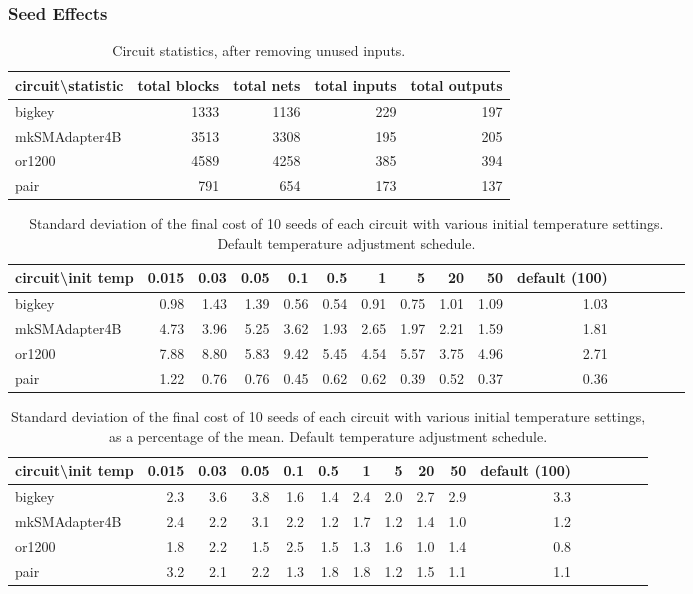 \documentclass[11pt]{article}
\begin{document}
\subsubsection{Seed Effects}

\begin{table} \centering
\begin{tabular}{l | *4r}
\hline\hline
circuit\textbackslash statistic & total blocks & total nets & total inputs & total outputs \\
\hline
bigkey & 1333 & 1136 & 229 & 197 \\
mkSMAdapter4B & 3513 & 3308 & 195 & 205 \\
or1200 & 4589 & 4258 & 385 & 394 \\
pair   & 791  &  654 & 173 & 137 \\
\hline\hline
\end{tabular}
\caption{Circuit statistics, after removing unused inputs.}
\label{tab:circuit-stats}
\end{table}

\begin{table}
\centering
\begin{tabular}{l | *{15}r}
\hline\hline
circuit\textbackslash init temp & 0.015 & 0.03 & 0.05 & 0.1 & 0.5 & 1 & 5 & 20 & 50 & default (100)\\
\hline
bigkey & 0.98 & 1.43 & 1.39 & 0.56 & 0.54 & 0.91 & 0.75 & 1.01 & 1.09 & 1.03 \\
mkSMAdapter4B & 4.73 & 3.96 & 5.25 & 3.62 & 1.93 & 2.65 & 1.97 & 2.21 & 1.59 & 1.81 \\
or1200 & 7.88 & 8.80 & 5.83 & 9.42 & 5.45 & 4.54 & 5.57 & 3.75 & 4.96 & 2.71 \\
pair & 1.22 & 0.76 & 0.76 & 0.45 & 0.62 & 0.62 & 0.39 & 0.52 & 0.37 & 0.36 \\
\hline\hline
\end{tabular}
\caption{Standard deviation of the final cost of 10 seeds of each circuit with various initial temperature settings. Default temperature adjustment schedule. }
\label{tab:stddev-by-temp}
\end{table}

\begin{table}
\centering
\begin{tabular}{l | *{15}r}
\hline\hline
circuit\textbackslash init temp & 0.015 & 0.03 & 0.05 & 0.1 & 0.5 & 1 & 5 & 20 & 50 & default (100)\\
\hline
bigkey & 2.3 & 3.6 & 3.8 & 1.6 & 1.4 & 2.4 & 2.0 & 2.7 & 2.9 & 3.3 \\
mkSMAdapter4B & 2.4 & 2.2 & 3.1 & 2.2 & 1.2 & 1.7 & 1.2 & 1.4 & 1.0 & 1.2 \\
or1200 & 1.8 & 2.2 & 1.5 & 2.5 & 1.5 & 1.3 & 1.6 & 1.0 & 1.4 & 0.8 \\
pair & 3.2 & 2.1 & 2.2 & 1.3 & 1.8 & 1.8 & 1.2 & 1.5 & 1.1 & 1.1 \\
\hline\hline
\end{tabular}
\caption{Standard deviation of the final cost of 10 seeds of each circuit with various initial temperature settings, as a percentage of the mean. Default temperature adjustment schedule. }
\label{tab:stddev-by-temp-as-percent}
\end{table}
\end{document}
